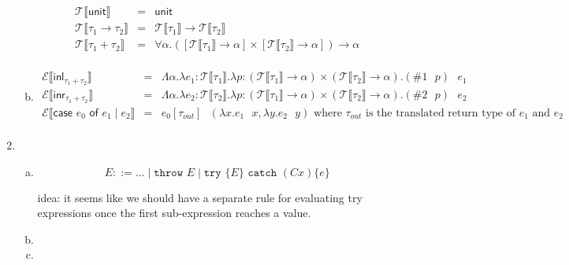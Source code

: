 \documentclass[10pt, oneside]{article}
\begin{document}
\begin{enumerate}[1.]
\begin{enumerate}[(a)]
				\begin{eqnarray*}
			\mathcal{T} \llbracket \textsf{unit} \rrbracket & = & \textsf{unit} \\
			\mathcal{T} \llbracket \tau_1 \rightarrow \tau_2 \rrbracket & = & \mathcal{T} \llbracket \tau_1 \rrbracket \rightarrow \mathcal{T} \llbracket \tau_2 \rrbracket \\
			\mathcal{T} \llbracket \tau_1 + \tau_2 \rrbracket & = & \forall \alpha. ([\mathcal{T}\llbracket \tau_1 \rrbracket \rightarrow \alpha] \times [\mathcal{T} \llbracket \tau_2 \rrbracket \rightarrow \alpha]) \rightarrow \alpha \\
		\end{eqnarray*}
		
		\item
		\begin{eqnarray*}
			\mathcal{E} \llbracket \textsf{inl}_{\tau_1 + \tau_2} \rrbracket & = & \Lambda \alpha. \lambda e_1:\mathcal{T} \llbracket \tau_1 \rrbracket.\lambda p: (\mathcal{T}\llbracket \tau_1 \rrbracket \rightarrow \alpha) \times (\mathcal{T} \llbracket \tau_2 \rrbracket \rightarrow \alpha). (\#1 \text{ } p) \text{ } e_1\\
			\mathcal{E} \llbracket \textsf{inr}_{\tau_1 + \tau_2} \rrbracket & = & \Lambda \alpha. \lambda e_2:\mathcal{T} \llbracket \tau_2 \rrbracket.\lambda p: (\mathcal{T}\llbracket \tau_1 \rrbracket \rightarrow \alpha) \times (\mathcal{T} \llbracket \tau_2 \rrbracket \rightarrow \alpha). (\#2 \text{ } p) \text{ } e_2\\
			\mathcal{E} \llbracket \textsf{case } e_0 \textsf{ of } e_1 \mid e_2 \rrbracket & = & e_0 [\tau_{out}] \text{ } (\lambda x. e_1 \text{ } x, \lambda y. e_2 \text{ } y) \text{ where $\tau_{out}$ is the translated return type of $e_1$ and $e_2$}\\
		\end{eqnarray*}
	\end{enumerate}

	\item
	\begin{enumerate}[(a)]
		\item
		$$E ::= ... \mid \texttt{throw } E \mid \texttt{try }\{E\} \texttt{ catch } (C x) \{e\} $$
		
		idea: it seems like we should have a separate rule for evaluating try 
		expressions once the first sub-expression reaches a value.
		\item
		\item
	\end{enumerate}
\end{enumerate}
\end{document}
